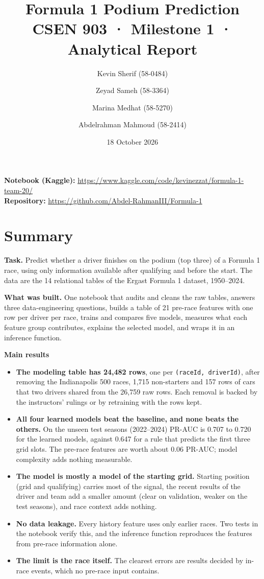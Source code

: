 \documentclass[11pt,a4paper]{article}
\title{Formula 1 Podium Prediction\\[4pt]\large CSEN 903 · Milestone 1 · Analytical Report}
\author{Kevin Sherif (58-0484) \and Zeyad Sameh (58-3364) \and Marina Medhat (58-5270) \and Abdelrahman Mahmoud (58-2414)}
\date{18 October 2026}
\begin{document}
\maketitle
\begin{center}\small
\textbf{Notebook (Kaggle):} \url{https://www.kaggle.com/code/kevinezzat/formula-1-team-20/} \\ \textbf{Repository:} \url{https://github.com/Abdel-RahmanIII/Formula-1}
\end{center}
\section{Summary}

\textbf{Task.} Predict whether a driver finishes on the podium (top three) of a Formula 1 race, using only information available after qualifying and before the start. The data are the 14 relational tables of the Ergast Formula 1 dataset, 1950–2024.

\textbf{What was built.} One notebook that audits and cleans the raw tables, answers three data-engineering questions, builds a table of 21 pre-race features with one row per driver per race, trains and compares five models, measures what each feature group contributes, explains the selected model, and wraps it in an inference function.

\textbf{Main results}

\begin{itemize}
\item \textbf{The modeling table has 24,482 rows}, one per \texttt{(raceId, driverId)}, after removing the Indianapolis 500 races, 1,715 non-starters and 157 rows of cars that two drivers shared from the 26,759 raw rows. Each removal is backed by the instructors' rulings or by retraining with the rows kept.
\item \textbf{All four learned models beat the baseline, and none beats the others.} On the unseen test seasons (2022–2024) PR-AUC is 0.707 to 0.720 for the learned models, against 0.647 for a rule that predicts the first three grid slots. The pre-race features are worth about 0.06 PR-AUC; model complexity adds nothing measurable.
\item \textbf{The model is mostly a model of the starting grid.} Starting position (grid and qualifying) carries most of the signal, the recent results of the driver and team add a smaller amount (clear on validation, weaker on the test seasons), and race context adds nothing.
\item \textbf{No data leakage.} Every history feature uses only earlier races. Two tests in the notebook verify this, and the inference function reproduces the features from pre-race information alone.
\item \textbf{The limit is the race itself.} The clearest errors are results decided by in-race events, which no pre-race input contains.
\end{itemize}
\end{document}
